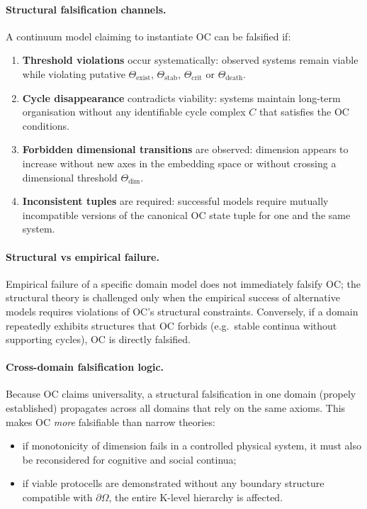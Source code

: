 \paragraph{Structural falsification channels.}
A continuum model claiming to instantiate OC can be falsified if:
\begin{enumerate}
  \item \textbf{Threshold violations} occur systematically:
        observed systems remain viable while violating putative
        \(\Theta_{\mathrm{exist}}\), \(\Theta_{\mathrm{stab}}\),
        \(\Theta_{\mathrm{crit}}\) or \(\Theta_{\mathrm{death}}\).
  \item \textbf{Cycle disappearance} contradicts viability:
        systems maintain long-term organisation without any identifiable
        cycle complex \(C\) that satisfies the OC conditions.
  \item \textbf{Forbidden dimensional transitions} are observed:
        dimension appears to increase without new axes in the embedding
        space or without crossing a dimensional threshold
        \(\Theta_{\mathrm{dim}}\).
  \item \textbf{Inconsistent tuples} are required:
        successful models require mutually incompatible versions of the
        canonical OC state tuple for one and the same system.
\end{enumerate}

\paragraph{Structural vs empirical failure.}
Empirical failure of a specific domain model does not immediately falsify OC;
the structural theory is challenged only when the empirical success of
alternative models requires violations of OC’s structural constraints.
Conversely, if a domain repeatedly exhibits structures that OC forbids
(e.g.\ stable continua without supporting cycles), OC is directly falsified.

\paragraph{Cross-domain falsification logic.}
Because OC claims universality, a structural falsification in one domain
(propely established) propagates across all domains that rely on the same
axioms.  This makes OC \emph{more} falsifiable than narrow theories:
\begin{itemize}
  \item if monotonicity of dimension fails in a controlled physical system,
        it must also be reconsidered for cognitive and social continua;
  \item if viable protocells are demonstrated without any boundary structure
        compatible with \(\partial\Omega\), the entire K-level hierarchy is
        affected.
\end{itemize}

